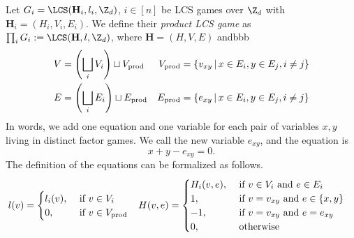 \begin{definition}
\label{def:lcs-game-product}
	Let $G_i=\LCS(\mathbf H_i, l_i, \Z_d)$, $i\in [n]$ be LCS games over $\Z_d$ with $\mathbf H_i=(H_i,V_i,E_i)$. We define their \emph{product LCS game} as $\prod_iG_i:= \LCS(\mathbf H, l, \Z_d)$, where $\mathbf H = (H,V,E)$ andbbb
	\begin{align}
	V &= \left(\bigsqcup_i V_i\right)\sqcup V_\text{prod}
	&V_\text{prod} &= \left\{v_{xy}\,\middle\vert\, x\in E_i, y\in E_j, i\neq j\right\}
	\\E &= \left(\bigsqcup_i E_i\right)\sqcup E_\text{prod}
	&E_\text{prod} &= \left\{e_{xy}\,\middle\vert\, x\in E_i, y\in E_j, i\neq j\right\}
	\end{align}
	In words, we add one equation and one variable for each pair of variables $x,y$ living in distinct factor games. We call the new variable $e_{xy}$, and the equation is
	\begin{equation}
		x + y - e_{xy} = 0.
	\end{equation}
	The definition of the equations can be formalized as follows.
	\begin{align}
	l(v) &= \begin{cases}
		l_i(v), &\text{ if }v\in V_i\\
		0, 		&\text{ if }v\in V_\text{prod}\\
		\end{cases}
	&
	H(v,e) &= \begin{cases}
		H_i(v,e), &\text{ if }v \in V_i\text{ and }e\in E_i\\
		1, &\text{ if }v = v_{xy}\text{ and }e \in \left\{x,y\right\}\\
		-1, &\text{ if }v = v_{xy}\text{ and }e = e_{xy}\\
		0, &\text{ otherwise }
		\end{cases}
	\end{align}
\end{definition}

